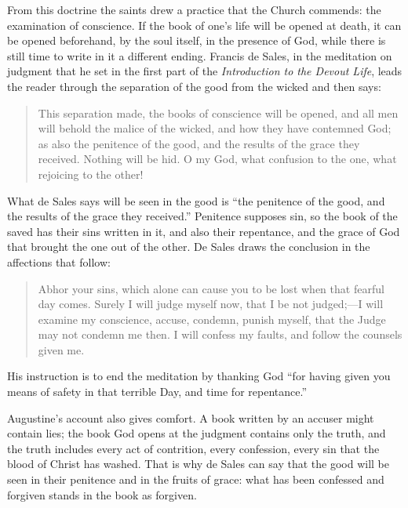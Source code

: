 From this doctrine the saints drew a practice that the Church commends: the examination of conscience. If the book of one's life will be opened at death, it can be opened beforehand, by the soul itself, in the presence of God, while there is still time to write in it a different ending. Francis de Sales, in the meditation on judgment that he set in the first part of the \emph{Introduction to the Devout Life}, leads the reader through the separation of the good from the wicked and then says:

\begin{quote}
This separation made, the books of conscience will be opened, and all men will behold the malice of the wicked, and how they have contemned God; as also the penitence of the good, and the results of the grace they received. Nothing will be hid. O my God, what confusion to the one, what rejoicing to the other!
\end{quote}

What de Sales says will be seen in the good is ``the penitence of the good, and the results of the grace they received.'' Penitence supposes sin, so the book of the saved has their sins written in it, and also their repentance, and the grace of God that brought the one out of the other. De Sales draws the conclusion in the affections that follow:

\ifdefined\TriptychPrintEdition
{}
\else
\fi
\begin{quote}
Abhor your sins, which alone can cause you to be lost when that fearful day comes. Surely I will judge myself now, that I be not judged;---I will examine my conscience, accuse, condemn, punish myself, that the Judge may not condemn me then. I will confess my faults, and follow the counsels given me.
\end{quote}

His instruction is to end the meditation by thanking God ``for having given you means of safety in that terrible Day, and time for repentance.''

Augustine's account also gives comfort. A book written by an accuser might contain lies; the book God opens at the judgment contains only the truth, and the truth includes every act of contrition, every confession, every sin that the blood of Christ has washed. That is why de Sales can say that the good will be seen in their penitence and in the fruits of grace: what has been confessed and forgiven stands in the book as forgiven.
